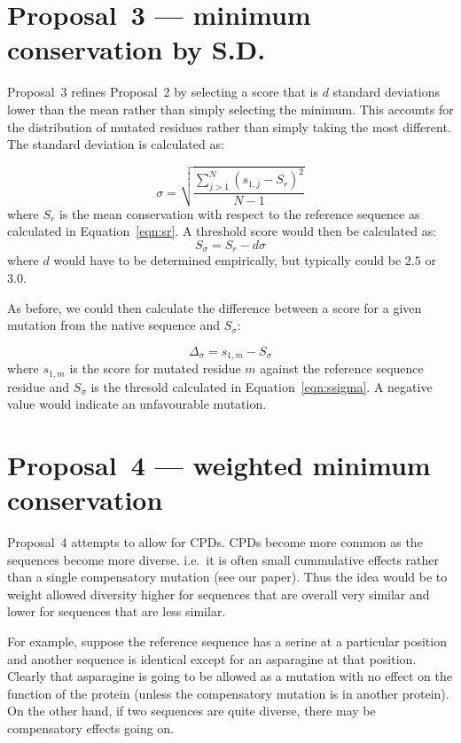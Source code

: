 \documentclass[a4paper]{article}
\begin{document}
\section{Proposal~3 --- minimum conservation by S.D.}
Proposal~3 refines Proposal~2 by selecting a score that is $d$
standard deviations lower than the mean rather than simply selecting
the minimum. This accounts for the distribution of mutated residues
rather than simply taking the most different. The standard deviation
is calculated as:

\begin{equation}\label{eqn:sigma}
  \sigma = \sqrt{\frac{\sum_{j>1}^N(s_{1,j} - S_r)^2}{N-1}}
\end{equation}
where $S_r$ is the mean conservation with respect to the reference
sequence as calculated in Equation~\ref{eqn:sr}. A threshold score would
then be calculated as:
\begin{equation}\label{eqn:ssigma}
  S_\sigma = S_r - d\sigma
\end{equation}
where $d$ would have to be determined empirically, but typically could
be $2.5$ or $3.0$.

As before, we could then calculate the difference between a score for
a given mutation from the native sequence and $S_\sigma$:

\begin{equation}
  \Delta_\sigma = s_{1, m} - S_\sigma
\end{equation}
where $s_{1,m}$ is the score for mutated residue $m$ against the
reference sequence residue and $S_\sigma$ is the thresold calculated in
Equation~\ref{eqn:ssigma}. A negative value would indicate an unfavourable
mutation. 


\section{Proposal~4 --- weighted minimum conservation}
Proposal~4 attempts to allow for CPDs. CPDs become more common as the
sequences become more diverse. i.e.\ it is often small cummulative
effects rather than a single compensatory mutation (see our paper).
Thus the idea would be to weight allowed diversity higher for
sequences that are overall very similar and lower for sequences that
are less similar.

For example, suppose the reference sequence has a serine at a
particular position and another sequence is identical except for an
asparagine at that position. Clearly that asparagine is going to be
allowed as a mutation with no effect on the function of the protein
(unless the compensatory mutation is in another protein). On the other
hand, if two sequences are quite diverse, there may be compensatory
effects going on.
\end{document}
